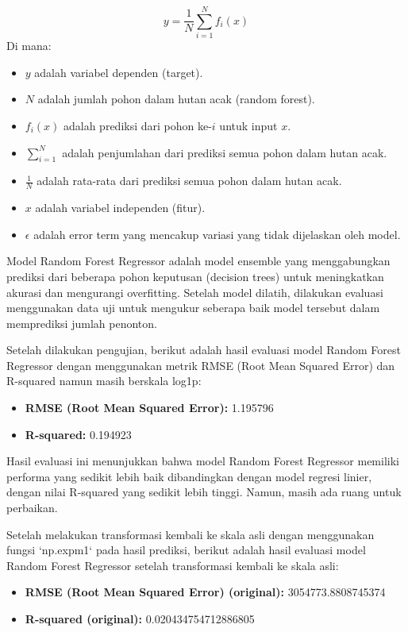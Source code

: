 \begin{equation}
    y = \frac{1}{N} \sum_{i=1}^{N} f_i(x)
\end{equation}
Di mana:
\begin{itemize}
    \item $y$ adalah variabel dependen (target).
    \item $N$ adalah jumlah pohon dalam hutan acak (random forest).
    \item $f_i(x)$ adalah prediksi dari pohon ke-$i$ untuk input $x$.
    \item $\sum_{i=1}^{N}$ adalah penjumlahan dari prediksi semua pohon dalam hutan acak.
    \item $\frac{1}{N}$ adalah rata-rata dari prediksi semua pohon dalam hutan acak.
    \item $x$ adalah variabel independen (fitur).
    \item $\epsilon$ adalah error term yang mencakup variasi yang tidak dijelaskan oleh model.
\end{itemize}

Model Random Forest Regressor adalah model ensemble yang menggabungkan prediksi dari beberapa pohon keputusan (decision trees) untuk meningkatkan akurasi dan mengurangi overfitting. Setelah model dilatih, dilakukan evaluasi menggunakan data uji untuk mengukur seberapa baik model tersebut dalam memprediksi jumlah penonton.

Setelah dilakukan pengujian, berikut adalah hasil evaluasi model Random Forest Regressor dengan menggunakan metrik RMSE (Root Mean Squared Error) dan R-squared namun masih berskala log1p:

\begin{itemize}
    \item \textbf{RMSE (Root Mean Squared Error):} 1.195796
    \item \textbf{R-squared:} 0.194923
\end{itemize}
Hasil evaluasi ini menunjukkan bahwa model Random Forest Regressor memiliki performa yang sedikit lebih baik dibandingkan dengan model regresi linier, dengan nilai R-squared yang sedikit lebih tinggi. Namun, masih ada ruang untuk perbaikan.

Setelah melakukan transformasi kembali ke skala asli dengan menggunakan fungsi `np.expm1` pada hasil prediksi, berikut adalah hasil evaluasi model Random Forest Regressor setelah transformasi kembali ke skala asli:

\begin{itemize}
    \item \textbf{RMSE (Root Mean Squared Error) (original):} 3054773.8808745374
    \item \textbf{R-squared (original):} 0.020434754712886805
\end{itemize}

